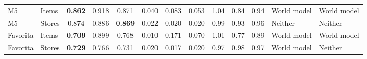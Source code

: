 \begin{table}[t]
\begin{adjustbox}{max width=\textwidth}
\begin{tabular}{ll ccc ccc ccc ll}
M5 & Items & \cellcolor{wmcell}\textbf{0.862} & 0.918 & 0.871 & 0.040 & 0.083 & 0.053 & 1.04 & 0.84 & 0.94 & \cellcolor{wmcell}World model & \cellcolor{wmcell}World model \\
M5 & Stores & 0.874 & 0.886 & \cellcolor{avgcell}\textbf{0.869} & 0.022 & 0.020 & 0.020 & 0.99 & 0.93 & 0.96 & Neither & Neither \\
Favorita & Items & \cellcolor{wmcell}\textbf{0.709} & 0.899 & 0.768 & 0.010 & 0.171 & 0.070 & 1.01 & 0.77 & 0.89 & \cellcolor{wmcell}World model & \cellcolor{wmcell}World model \\
Favorita & Stores & \cellcolor{wmcell}\textbf{0.729} & 0.766 & 0.731 & 0.020 & 0.017 & 0.020 & 0.97 & 0.98 & 0.97 & \cellcolor{wmcell}World model & Neither \\
\bottomrule
\end{tabular}\end{adjustbox}
\end{table}
